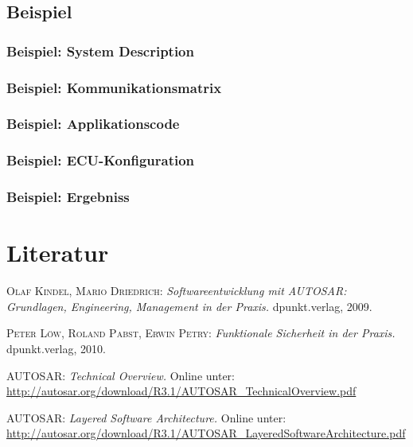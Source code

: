 \documentclass[]{beamer}
\begin{document}
\subsection{Beispiel}
\label{sec:beispiel}

\begin{frame}
\frametitle{Beispiel: System Description}

\end{frame}

\begin{frame}
\frametitle{Beispiel: Kommunikationsmatrix}

\end{frame}

\begin{frame}
\frametitle{Beispiel: Applikationscode}

\end{frame}

\begin{frame}
\frametitle{Beispiel: ECU-Konfiguration}

\end{frame}

\begin{frame}
\frametitle{Beispiel: Ergebniss}

\end{frame}









\appendix
\section*{Literatur}
\label{sec:Literatur}

\begin{frame}


\begin{thebibliography}{10}

 \textsc{Olaf Kindel, Mario Driedrich}: {\em Softwareentwicklung mit AUTOSAR: Grundlagen, Engineering, Management in der Praxis.} dpunkt.verlag, 2009.

 \textsc{Peter Löw, Roland Pabst, Erwin Petry}: {\em Funktionale Sicherheit in der Praxis.} dpunkt.verlag, 2010.

 \textsc{AUTOSAR}: {\em Technical Overview.} Online unter: \url{http://autosar.org/download/R3.1/AUTOSAR_TechnicalOverview.pdf}

 \textsc{AUTOSAR}: {\em Layered Software Architecture.} Online unter: \url{http://autosar.org/download/R3.1/AUTOSAR_LayeredSoftwareArchitecture.pdf}

\end{thebibliography}


\end{frame}
\end{document}
